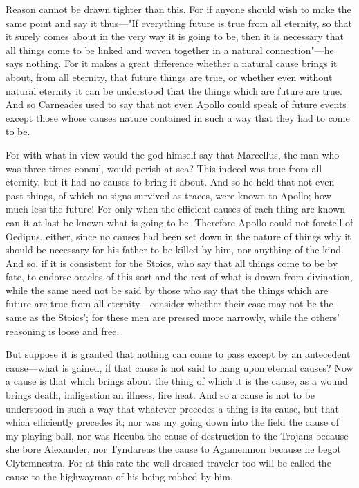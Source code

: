  Reason cannot be drawn tighter than this. For if anyone should wish to make the same point and say it thus—"If everything future is true from all eternity, so that it surely comes about in the very way it is going to be, then it is necessary that all things come to be linked and woven together in a natural connection"—he says nothing. For it makes a great difference whether a natural cause brings it about, from all eternity, that future things are true, or whether even without natural eternity it can be understood that the things which are future are true. And so Carneades used to say that not even Apollo could speak of future events except those whose causes nature contained in such a way that they had to come to be.

 For with what in view would the god himself say that Marcellus, the man who was three times consul, would perish at sea? This indeed was true from all eternity, but it had no causes to bring it about. And so he held that not even past things, of which no signs survived as traces, were known to Apollo; how much less the future! For only when the efficient causes of each thing are known can it at last be known what is going to be. Therefore Apollo could not foretell of Oedipus, either, since no causes had been set down in the nature of things why it should be necessary for his father to be killed by him, nor anything of the kind. And so, if it is consistent for the Stoics, who say that all things come to be by fate, to endorse oracles of this sort and the rest of what is drawn from divination, while the same need not be said by those who say that the things which are future are true from all eternity—consider whether their case may not be the same as the Stoics'; for these men are pressed more narrowly, while the others' reasoning is loose and free.

 But suppose it is granted that nothing can come to pass except by an antecedent cause—what is gained, if that cause is not said to hang upon eternal causes? Now a cause is that which brings about the thing of which it is the cause, as a wound brings death, indigestion an illness, fire heat. And so a cause is not to be understood in such a way that whatever precedes a thing is its cause, but that which efficiently precedes it; nor was my going down into the field the cause of my playing ball, nor was Hecuba the cause of destruction to the Trojans because she bore Alexander, nor Tyndareus the cause to Agamemnon because he begot Clytemnestra. For at this rate the well-dressed traveler too will be called the cause to the highwayman of his being robbed by him.

